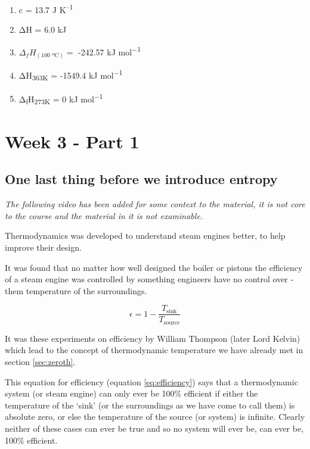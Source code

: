 \documentclass[
]{book}
\providecommand{\tightlist}{%
  \setlength{\itemsep}{0pt}\setlength{\parskip}{0pt}}
\begin{document}
\begin{enumerate}
\def\labelenumi{\arabic{enumi}.}
\tightlist
\item
  c = 13.7 J K\textsuperscript{--1}
\item
  ΔH = 6.0 kJ
\item
  \(\Delta _f H _{(\textrm{100 ºC})}=\) -242.57 kJ mol\textsuperscript{−1}
\item
  ΔH\textsubscript{363K} = -1549.4 kJ mol\textsuperscript{−1}
\item
  Δ\textsubscript{f}H\textsubscript{273K} = 0 kJ mol\textsuperscript{−1}
\end{enumerate}

\hypertarget{ch:Part5}{%
\chapter{Week 3 - Part 1}\label{ch:Part5}}

\hypertarget{one-last-thing-before-we-introduce-entropy}{%
\section{One last thing before we introduce entropy}\label{one-last-thing-before-we-introduce-entropy}}

\emph{The following video has been added for some context to the material, it is not core to the course and the material in it is not examinable.}

Thermodynamics was developed to understand steam engines better, to help improve their design.

It was found that no matter how well designed the boiler or pistons the efficiency of a steam engine was controlled by something engineers have no control over - them temperature of the surroundings.

\begin{equation}
\epsilon = 1-\frac{T_{\textrm{sink}}}{T_{\textrm{source}}}
\label{eq:efficiency}
\end{equation}

It was these experiments on efficiency by William Thompson (later Lord Kelvin) which lead to the concept of thermodynamic temperature we have already met in section \ref{sec:zeroth}.

This equation for efficiency (equation \eqref{eq:efficiency}) says that a thermodynamic system (or steam engine) can only ever be 100\% efficient if either the temperature of the `sink' (or the surroundings as we have come to call them) is absolute zero, or else the temperature of the source (or system) is infinite. Clearly neither of these cases can ever be true and so no system will ever be, can ever be, 100\% efficient.
\end{document}
